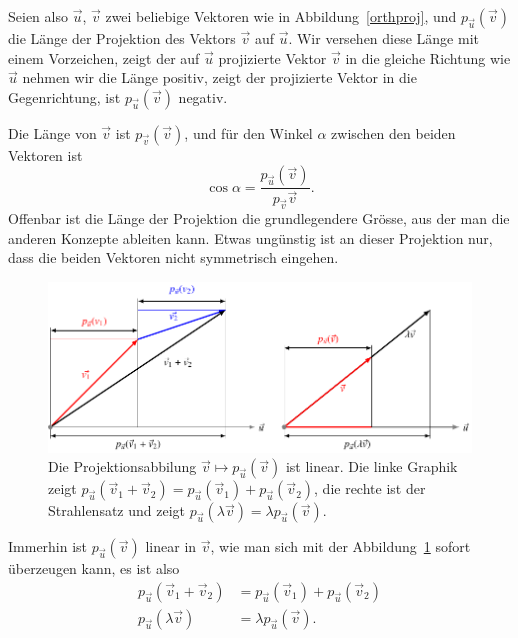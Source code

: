 Seien also $\vec u$, $\vec v$ zwei beliebige Vektoren wie in Abbildung~\ref{orthproj}, und $p_{\vec u}(\vec v)$
die Länge der Projektion des Vektors $\vec v$ auf $\vec u$.
Wir versehen diese Länge mit einem Vorzeichen, zeigt der auf $\vec u$
projizierte Vektor $\vec v$ in die gleiche Richtung wie $\vec u$
nehmen wir die Länge positiv, zeigt der projizierte Vektor in die
Gegenrichtung, ist $p_{\vec u}(\vec v)$ negativ.

Die Länge von $\vec v$ ist $p_{\vec v}(\vec v)$, und für den Winkel
$\alpha$ zwischen den beiden Vektoren ist
\begin{equation}
\cos \alpha = \frac{p_{\vec u}(\vec v)}{p_{\vec v}{\vec v}}.
\label{zwischenwinkel}
\end{equation}
Offenbar ist die Länge der Projektion die grundlegendere Grösse,
aus der man die anderen Konzepte ableiten kann.
Etwas ungünstig ist an dieser Projektion nur, dass die beiden Vektoren nicht
symmetrisch eingehen.
\begin{figure}
\centering
\includegraphics{4/images/linearitaet.pdf}
\caption{Die Projektionsabbilung
$\vec{v}\mapsto p_{\vec{u}}(\vec{v})$
ist linear. Die linke Graphik zeigt
$p_{\vec{u}}(\vec{v}_1+\vec{v}_2)
=
p_{\vec{u}}(\vec{v}_1)+p_{\vec{u}}(\vec{v}_2)$,
die rechte ist der Strahlensatz und zeigt
$p_{\vec{u}}(\lambda\vec{v})=\lambda p_{\vec{u}}(\vec{v})$.
\label{projektionlinearitaet}}
\end{figure}
Immerhin ist $p_{\vec u}(\vec v)$ linear in $\vec v$, wie man
sich mit der Abbildung~\ref{projektionlinearitaet}
sofort überzeugen kann, es ist also
\begin{align*}
p_{\vec u}(\vec v_1+\vec v_2)&=p_{\vec u}(\vec v_1)+p_{\vec u}(\vec v_2)\\
p_{\vec u}(\lambda \vec v)&=\lambda p_{\vec u}(\vec v).
\end{align*}

